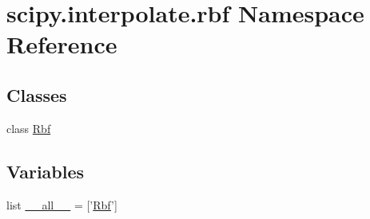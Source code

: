 \hypertarget{namespacescipy_1_1interpolate_1_1rbf}{}\section{scipy.\+interpolate.\+rbf Namespace Reference}
\label{namespacescipy_1_1interpolate_1_1rbf}
\subsection*{Classes}
\begin{DoxyCompactItemize}
\item 
class \hyperlink{classscipy_1_1interpolate_1_1rbf_1_1Rbf}{Rbf}
\end{DoxyCompactItemize}
\subsection*{Variables}
\begin{DoxyCompactItemize}
\item 
list \hyperlink{namespacescipy_1_1interpolate_1_1rbf_a18e979cab6bc379948fec668f561ffca}{\+\_\+\+\_\+all\+\_\+\+\_\+} = \mbox{[}'\hyperlink{classscipy_1_1interpolate_1_1rbf_1_1Rbf}{Rbf}'\mbox{]}
\end{DoxyCompactItemize}


